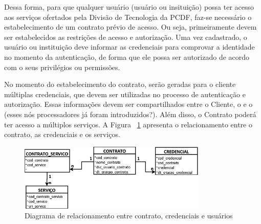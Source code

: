 Dessa forma, para que qualquer usu\'{a}rio {\color{red}(usuário ou insitui\c c\~{a}o)}
possa ter acesso aos serviços ofertados pela Divisão de Tecnologia da PCDF,
faz-se necess\'{a}rio o estabelecimento de um contrato prévio de acesso. Ou seja,
primeiramente devem ser estabelecidos as restri\c c\~{o}es de acesso e autorização.
Uma vez cadastrado, o {\color{red}usuário ou institui\c c\~{a}o} deve
informar as credenciais para comprovar a identidade no momento da autenticação,
de forma que ele possa ser autorizado de acordo com o seus {\color{red}privilégios ou permiss\~{o}es}.

No momento do estabelecimento do contrato, ser\~{a}o geradas
para o cliente múltiplas credenciais, que devem ser utilizadas no processo de autenticação e
autorização. Essas informações
devem ser compartilhados entre o Cliente, o \servidorAA{} e o \servidorRest{}
({\color{red}esses n\'{o}s processadores j\'{a} foram introduzidos?}).
Além disso, o Contrato poderá ter acesso a múltiplos serviços. A Figura ~\ref{fig:diagrama_relacionamento} apresenta o relacionamento entre o contrato, as credenciais e os serviços.

\begin{figure}[!htb]
    \centering
    \includegraphics[width=0.8\textwidth]{modelo_relacionamento_contrato1.png}
    \caption{Diagrama de relacionamento entre contrato, credenciais e usuários}
    \label{fig:diagrama_relacionamento}
\end{figure}




